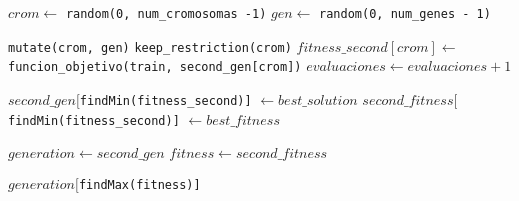 \begin{algorithm}[H]
\begin{algorithmic}[1]
		\State $crom \gets$ \texttt{random(0, num\_cromosomas -1)}
		\State $gen \gets$ \texttt{random(0, num\_genes - 1)}
		
		\vspace{0.2cm}	
		\State \texttt{mutate(crom, gen)}
		\State \texttt{keep\_restriction(crom)}
		\vspace{0.2cm}	
		\State $fitness\_second[crom] \gets$ \texttt{funcion\_objetivo(train, second\_gen[crom])}
		\State $evaluaciones \gets evaluaciones + 1$
		
		\EndFor
		
		
		\State $second\_gen[$\texttt{findMin(fitness\_second)]} $\gets best\_solution$
		\State $second\_fitness[$\texttt{findMin(fitness\_second)]} $\gets best\_fitness$
		\EndIf
		
		
		\State $generation \gets second\_gen$
		\State $fitness \gets second\_fitness$
		
		\EndWhile		
		
		\Return $generation[$\texttt{findMax(fitness)]}
		
		\EndProcedure
	\end{algorithmic}
\end{algorithm}

